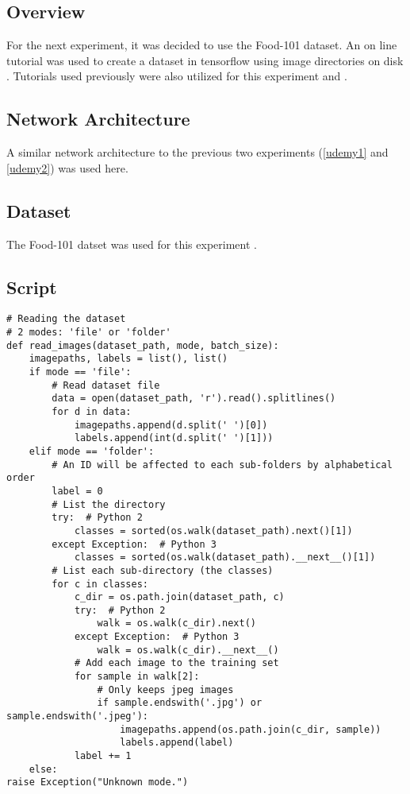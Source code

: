 \subsection*{Overview}
For the next experiment, it was decided to use the Food-101 dataset.
An on line tutorial was used to create a dataset in tensorflow using image directories on disk \parencite{file_dir_code}.
Tutorials used previously were also utilized for this experiment \parencite{udemy} and \parencite{cifar}.

\subsection*{Network Architecture}
A similar network architecture to the previous two experiments (\ref{udemy1} and \ref{udemy2}) was used here.

\subsection*{Dataset}
The Food-101 datset was used for this experiment \parencite{food101}.

\subsection*{Script}
\begin{lstlisting}[style=Python]
# Reading the dataset
# 2 modes: 'file' or 'folder'
def read_images(dataset_path, mode, batch_size):
    imagepaths, labels = list(), list()
    if mode == 'file':
        # Read dataset file
        data = open(dataset_path, 'r').read().splitlines()
        for d in data:
            imagepaths.append(d.split(' ')[0])
            labels.append(int(d.split(' ')[1]))
    elif mode == 'folder':
        # An ID will be affected to each sub-folders by alphabetical order
        label = 0
        # List the directory
        try:  # Python 2
            classes = sorted(os.walk(dataset_path).next()[1])
        except Exception:  # Python 3
            classes = sorted(os.walk(dataset_path).__next__()[1])
        # List each sub-directory (the classes)
        for c in classes:
            c_dir = os.path.join(dataset_path, c)
            try:  # Python 2
                walk = os.walk(c_dir).next()
            except Exception:  # Python 3
                walk = os.walk(c_dir).__next__()
            # Add each image to the training set
            for sample in walk[2]:
                # Only keeps jpeg images
                if sample.endswith('.jpg') or sample.endswith('.jpeg'):
                    imagepaths.append(os.path.join(c_dir, sample))
                    labels.append(label)
            label += 1
    else:
raise Exception("Unknown mode.")
\end{lstlisting}

